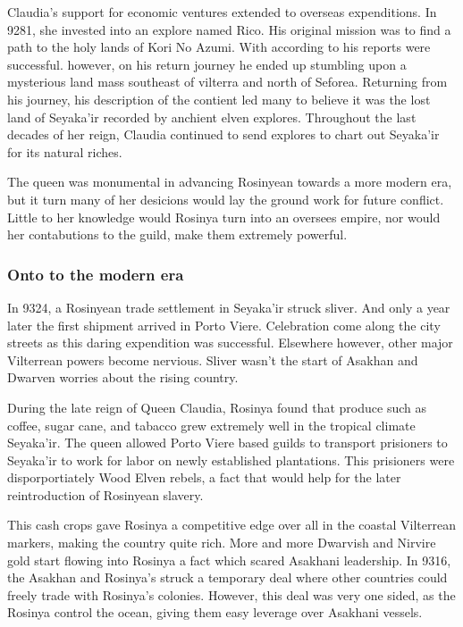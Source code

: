 \documentclass[../main.tex]{subfiles}
\begin{document}
Claudia's support for economic ventures extended to overseas expenditions. In 9281, she invested into
an explore named Rico. His original mission was to find a path to the holy lands of Kori No Azumi.
With according to his reports were successful. however, on his return journey he ended up stumbling
upon a mysterious land mass southeast of vilterra and north of Seforea. Returning from his journey,
his description of the contient led many to believe it was the lost land of Seyaka'ir recorded by 
anchient elven explores. Throughout the last decades of her reign, Claudia continued to send explores
to chart out Seyaka'ir for its natural riches. 

The queen was monumental in advancing Rosinyean towards a more modern era, but it turn many of her 
desicions would lay the ground work for future conflict. Little to her knowledge would Rosinya turn
into an oversees empire, nor would her contabutions to the guild, make them extremely powerful.

\subsubsection{Onto to the modern era}
In 9324, a Rosinyean trade settlement in Seyaka'ir struck sliver. And only a year later the first 
shipment arrived in Porto Viere. Celebration come along the city streets as this daring expendition
was successful. Elsewhere however, other major Vilterrean powers become nervious. Sliver wasn't 
the start of Asakhan and Dwarven worries about the rising country. 

During the late reign of Queen Claudia, Rosinya found that produce such as coffee, sugar cane, and 
tabacco grew extremely well in the tropical climate Seyaka'ir. The queen allowed Porto Viere based
guilds to transport prisioners to Seyaka'ir to work for labor on newly established plantations. 
This prisioners were disporportiately Wood Elven rebels, a fact that would help for the later
reintroduction of Rosinyean slavery. 

This cash crops gave Rosinya a competitive edge over all in the coastal Vilterrean markers, making 
the country quite rich. More and more Dwarvish and Nirvire gold start flowing into Rosinya a fact 
which scared Asakhani leadership. In 9316, the Asakhan and Rosinya's struck a temporary deal where
other countries could freely trade with Rosinya's colonies. However, this deal was very one sided,
as the Rosinya control the ocean, giving them easy leverage over Asakhani vessels. 
\end{document}
